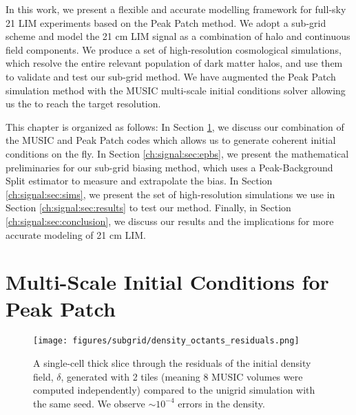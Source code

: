 In this work, we present a flexible and accurate modelling framework for full-sky 21 LIM experiments based on the Peak Patch \citep{peakpatch1} method. We adopt a sub-grid scheme and model the 21 cm LIM signal as a combination of halo and continuous field components. We produce a set of high-resolution cosmological simulations, which resolve the entire relevant population of dark matter halos, and use them to validate and test our sub-grid method. We have augmented the Peak Patch simulation method with the MUSIC multi-scale initial conditions solver allowing us the to reach the target resolution.

This chapter is organized as follows: In Section \ref{ch:signal:sec:music}, we discuss our combination of the MUSIC and Peak Patch codes which allows us to generate coherent initial conditions on the fly. In Section \ref{ch:signal:sec:epbs}, we present the mathematical preliminaries for our sub-grid biasing method, which uses a Peak-Background Split \citep{biasreview} estimator to measure and extrapolate the bias. In Section \ref{ch:signal:sec:sims}, we present the set of high-resolution simulations we use in Section \ref{ch:signal:sec:results} to test our method. Finally, in Section \ref{ch:signal:sec:conclusion}, we discuss our results and the implications for more accurate modeling of 21 cm LIM.

\section{Multi-Scale Initial Conditions for Peak Patch}
\label{ch:signal:sec:music}

\begin{figure} %
\begin{center}
\texttt{[image: figures/subgrid/density\_octants\_residuals.png]}%
\caption{A single-cell thick slice through the residuals of the initial density field, $\delta$, generated with 2 tiles (meaning 8 MUSIC volumes were computed independently) compared to the unigrid simulation with the same seed. We observe $\sim 10^{-4}$ errors in the density.}
\label{density_octants_residuals}
\end{center}
\end{figure}

